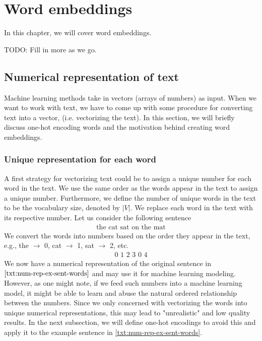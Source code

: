 \chapter{Word embeddings}
In this chapter, we will cover word embeddings.

TODO: Fill in more as we go.

\section{Numerical representation of text}
Machine learning methods take in vectors (arrays of numbers) as input. When we want to work with text, we have to come up with some procedure for converting text into a vector, (i.e. vectorizing the text). In this section, we will briefly discuss one-hot encoding words and the motivation behind creating word embeddings.

\subsection{Unique representation for each word}
\label{unique-representation-for-each-word}
A first strategy for vectorizing text could be to assign a unique number for each word in the text. We use the same order as the words appear in the text to assign a unique number. Furthermore, we define the number of unique words in the text to be the vocabulary size, denoted by $|V|$. We replace each word in the text with its respective number. Let us consider the following sentence
\begin{align}
    \text{the cat sat on the mat} \label{txt:num-rep-ex-sent-words}
\end{align}
\noindent
We convert the words into numbers based on the order they appear in the text, e.g., the $\rightarrow$ 0, cat $\rightarrow$ 1, sat $\rightarrow$ 2, etc.
\begin{align}
    \text{0 1 2 3 0 4} \label{txt:num-rep-ex-sent}
\end{align}
We now have a numerical representation of the original sentence in $\ref{txt:num-rep-ex-sent-words}$ and may use it for machine learning modeling. However, as one might note, if we feed such numbers into a machine learning model, it might be able to learn and abuse the natural ordered relationship between the numbers. Since we only concerned with vectorizing the words into unique numerical representations, this may lead to "unrealistic" and low quality results. In the next subsection, we will define one-hot encodings to avoid this and apply it to the example sentence in \ref{txt:num-rep-ex-sent-words}.

